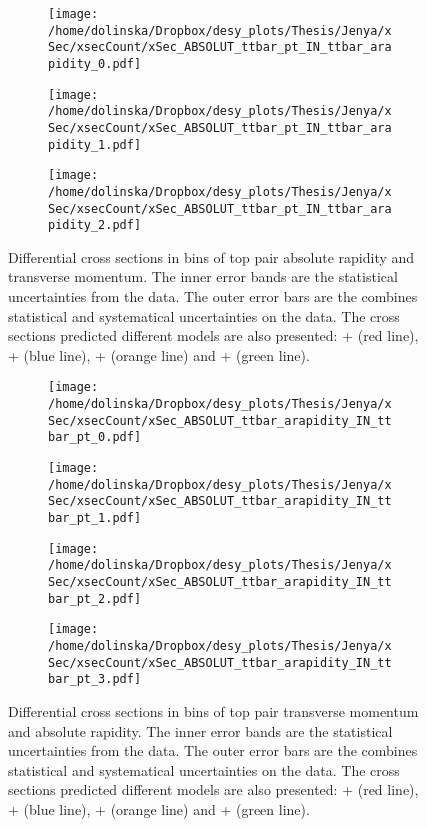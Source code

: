 \begin{figure}[p]
\centering
\begin{subfigure}
  \centering
  \texttt{[image: /home/dolinska/Dropbox/desy\_plots/Thesis/Jenya/xSec/xsecCount/xSec\_ABSOLUT\_ttbar\_pt\_IN\_ttbar\_arapidity\_0.pdf]}
\end{subfigure}
\begin{subfigure}
  \centering
  \texttt{[image: /home/dolinska/Dropbox/desy\_plots/Thesis/Jenya/xSec/xsecCount/xSec\_ABSOLUT\_ttbar\_pt\_IN\_ttbar\_arapidity\_1.pdf]}
\end{subfigure}
\begin{subfigure}
  \centering
  \texttt{[image: /home/dolinska/Dropbox/desy\_plots/Thesis/Jenya/xSec/xsecCount/xSec\_ABSOLUT\_ttbar\_pt\_IN\_ttbar\_arapidity\_2.pdf]}
\end{subfigure}
\caption{Differential cross sections in bins of top pair absolute rapidity and transverse momentum. The inner error bands are the statistical uncertainties from the data.
         The outer error bars are the combines statistical and systematical uncertainties on the data. The cross sections predicted different models are also presented:
         \MG + \PYTHIA (red line), \Powheg + \PYTHIA (blue line), \Powheg + \HERWIG (orange line) and \MCNLO + \HERWIG (green line).}
\label{fig:XSU_2D_pttt_ytt}
\end{figure}
\begin{figure}[p]
\centering
\begin{subfigure}
  \centering
  \texttt{[image: /home/dolinska/Dropbox/desy\_plots/Thesis/Jenya/xSec/xsecCount/xSec\_ABSOLUT\_ttbar\_arapidity\_IN\_ttbar\_pt\_0.pdf]}
\end{subfigure}
\begin{subfigure}
  \centering
  \texttt{[image: /home/dolinska/Dropbox/desy\_plots/Thesis/Jenya/xSec/xsecCount/xSec\_ABSOLUT\_ttbar\_arapidity\_IN\_ttbar\_pt\_1.pdf]}
\end{subfigure}
\begin{subfigure}
  \centering
  \texttt{[image: /home/dolinska/Dropbox/desy\_plots/Thesis/Jenya/xSec/xsecCount/xSec\_ABSOLUT\_ttbar\_arapidity\_IN\_ttbar\_pt\_2.pdf]}
\end{subfigure}
\begin{subfigure}
  \centering
  \texttt{[image: /home/dolinska/Dropbox/desy\_plots/Thesis/Jenya/xSec/xsecCount/xSec\_ABSOLUT\_ttbar\_arapidity\_IN\_ttbar\_pt\_3.pdf]}
\end{subfigure}
\caption{Differential cross sections in bins of top pair transverse momentum and absolute rapidity. The inner error bands are the statistical uncertainties from the data.
         The outer error bars are the combines statistical and systematical uncertainties on the data. The cross sections predicted different models are also presented:
         \MG + \PYTHIA (red line), \Powheg + \PYTHIA (blue line), \Powheg + \HERWIG (orange line) and \MCNLO + \HERWIG (green line).}
\label{fig:XSU_2D_pttt_ytt1}
\end{figure}

